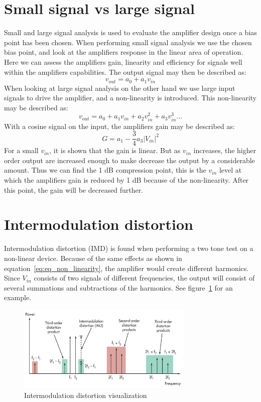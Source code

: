 \section{Small signal vs large signal}
Small and large signal analysis is used to evaluate the amplifier design once a bias point has been chosen. When performing small signal analysis we use the chosen bias point, and look at the amplifiers response in the linear area of operation. Here we can assess the amplifiers gain, linearity and efficiency for signals well within the amplifiers capabilities. The output signal may then be described as:
\begin{equation}
v_{out}=a_0+a_1v_{in}
\end{equation}
When looking at large signal analysis on the other hand we use large input signals to drive the amplifier, and a non-linearity is introduced. This non-linearity may be described as:
\begin{equation}
v_{out}=a_0+a_1v_{in}+a_2v_{in}^2+a_3v_{in}^3 \dots
\label{eq:eq_non_linearity}
\end{equation}
With a cosine signal on the input, the amplifiers gain may be described as:
\begin{equation}
G=a_1-\frac{3}{4}a_3|V_{in}|^2
\end{equation}
 For a small $v_{in}$, it is shown that the gain is linear. But as $v_{in}$ increases, the higher order output are increased enough to make decrease the output by a considerable amount. Thus we can find the 1 dB compression point, this is the $v_{in}$ level at which the amplifiers gain is reduced by 1 dB because of the non-linearity. After this point, the gain will be decreased further.

\section{Intermodulation distortion}

Intermodulation distortion (IMD) is found when performing a two tone test on a non-linear device. Because of the same effects as shown in equation~\ref{eq:eq_non_linearity}, the amplifier would create different harmonics. Since $V_{in}$ consists of two signals of different frequencies, the output will consist of several summations and subtractions of the harmonics. See figure~\ref{fig:fig_distortion_vis} for an example.

\begin{figure}[H]
	  \centering
	  \includegraphics[width=0.75\textwidth]{img/Intermodulation_distortion}
	  \caption{Intermodulation distortion visualization}
	  \label{fig:fig_distortion_vis}
\end{figure}
